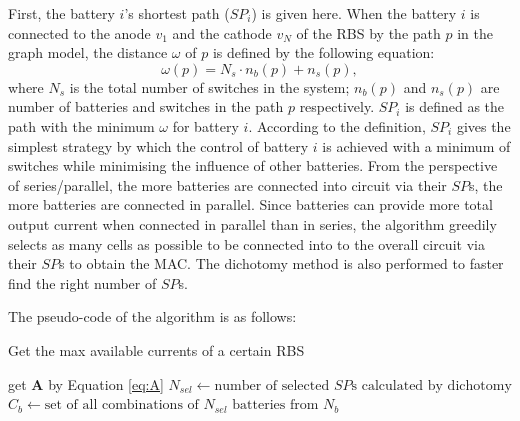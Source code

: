 \documentclass{article}
\begin{document}
First, the battery $i$'s shortest path ($SP_i$) is given here.
When the battery $i$ is connected to the anode $v_1$ and the cathode $v_N$ of the RBS by the path $p$ in the graph model, the distance $\omega$ of $p$ is defined by the following equation:
\begin{equation}\label{eq:weight}
    \omega(p) = N_s \cdot n_b (p) + n_s (p),
\end{equation}
where $N_s$ is the total number of switches in the system; $n_b(p)$ and $n_s(p)$ are number of batteries and switches in the path $p$ respectively.
$SP_i$ is defined as the path with the minimum $\omega$ for battery $i$.
According to the definition, $SP_i$ gives the simplest strategy by which the control of battery $i$ is achieved with a minimum of switches while minimising the influence of other batteries.
From the perspective of series/parallel, the more batteries are connected into circuit via their $SP$s, the more batteries are connected in parallel.
Since batteries can provide more total output current when connected in parallel than in series, the algorithm greedily selects as many cells as possible to be connected into to the overall circuit via their $SP$s to obtain the MAC.
The dichotomy method is also performed to faster find the right number of $SP$s.


The pseudo-code of the algorithm is as follows:
\begin{algorithm}
    \caption{Get the max available currents of a certain RBS}\label{alg:eta_RBS}
    \KwResult{$\max \eta$}
    get $\bm{A}$ by Equation \ref{eq:A}\;
    {
        $N_{sel} \leftarrow \text{number of selected $SP$s calculated by dichotomy}$\;
        $C_b    \leftarrow \text{set of all combinations of $N_{sel} $~batteries from $N_b$}$\;
    }
\end{algorithm}
\end{document}
